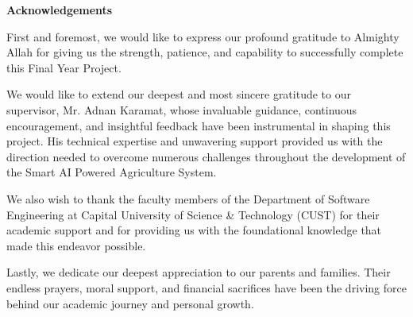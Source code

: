 
\clearpage


\vspace*{-0.15cm} 
{\centering
    {\fontsize{16pt}{20pt}\selectfont \textbf{Acknowledgements} \par}
}
\vspace{0.5cm}

\noindent
First and foremost, we would like to express our profound gratitude to Almighty Allah for giving us the strength, patience, and capability to successfully complete this Final Year Project. 

We would like to extend our deepest and most sincere gratitude to our supervisor, Mr. Adnan Karamat, whose invaluable guidance, continuous encouragement, and insightful feedback have been instrumental in shaping this project. His technical expertise and unwavering support provided us with the direction needed to overcome numerous challenges throughout the development of the Smart AI Powered Agriculture System.

We also wish to thank the faculty members of the Department of Software Engineering at Capital University of Science \& Technology (CUST) for their academic support and for providing us with the foundational knowledge that made this endeavor possible.

Lastly, we dedicate our deepest appreciation to our parents and families. Their endless prayers, moral support, and financial sacrifices have been the driving force behind our academic journey and personal growth.
